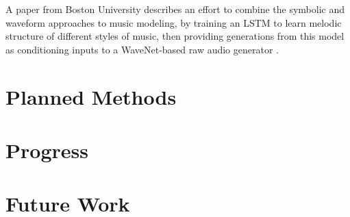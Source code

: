 \documentclass[sigconf,authorversion]{acmart}
\begin{document}
A paper from Boston University describes an effort to combine the symbolic and
waveform approaches to music modeling, by training an LSTM to learn melodic
structure of different styles of music, then providing generations from this
model as conditioning inputs to a WaveNet-based raw audio generator
\cite{manzelli_conditioning_2018}.

\section{Planned Methods}

\section{Progress}

\section{Future Work}



\end{document}
